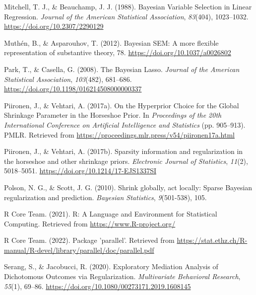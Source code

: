 \documentclass[
  man, donotrepeattitle,floatsintext]{apa6}
\newlength{\cslhangindent}
\newlength{\cslentryspacingunit} %
\newenvironment{CSLReferences}[2] %
 {%
  \setlength{\parindent}{0pt}
  \ifodd #1
  \let\oldpar\par
  \def\par{\hangindent=\cslhangindent\oldpar}
  \fi
  \setlength{\parskip}{#2\cslentryspacingunit}
 }%
 {}
\begin{document}
\begin{CSLReferences}{1}{0}
\leavevmode{}%
Mitchell, T. J., \& Beauchamp, J. J. (1988). Bayesian {Variable} {Selection} in {Linear} {Regression}. \emph{Journal of the American Statistical Association}, \emph{83}(404), 1023--1032. \url{https://doi.org/10.2307/2290129}

\leavevmode{}%
Muthén, B., \& Asparouhov, T. (2012). Bayesian {SEM}: {A} more ﬂexible representation of substantive theory, 78. \url{https://doi.org/10.1037/a0026802}

\leavevmode{}%
Park, T., \& Casella, G. (2008). The {Bayesian} {Lasso}. \emph{Journal of the American Statistical Association}, \emph{103}(482), 681--686. \url{https://doi.org/10.1198/016214508000000337}

\leavevmode{}%
Piironen, J., \& Vehtari, A. (2017a). On the {Hyperprior} {Choice} for the {Global} {Shrinkage} {Parameter} in the {Horseshoe} {Prior}. In \emph{Proceedings of the 20th {International} {Conference} on {Artificial} {Intelligence} and {Statistics}} (pp. 905--913). PMLR. Retrieved from \url{https://proceedings.mlr.press/v54/piironen17a.html}

\leavevmode{}%
Piironen, J., \& Vehtari, A. (2017b). Sparsity information and regularization in the horseshoe and other shrinkage priors. \emph{Electronic Journal of Statistics}, \emph{11}(2), 5018--5051. \url{https://doi.org/10.1214/17-EJS1337SI}

\leavevmode{}%
Polson, N. G., \& Scott, J. G. (2010). Shrink globally, act locally: {Sparse} {Bayesian} regularization and prediction. \emph{Bayesian Statistics}, \emph{9}(501-538), 105.

\leavevmode{}%
R Core Team. (2021). R: {A} {Language} and {Environment} for {Statistical} {Computing}. Retrieved from \url{https://www.R-project.org/}

\leavevmode{}%
R Core Team. (2022). Package 'parallel'. Retrieved from \url{https://stat.ethz.ch/R-manual/R-devel/library/parallel/doc/parallel.pdf}

\leavevmode{}%
Serang, S., \& Jacobucci, R. (2020). Exploratory {Mediation} {Analysis} of {Dichotomous} {Outcomes} via {Regularization}. \emph{Multivariate Behavioral Research}, \emph{55}(1), 69--86. \url{https://doi.org/10.1080/00273171.2019.1608145}


\end{CSLReferences}
\end{document}

